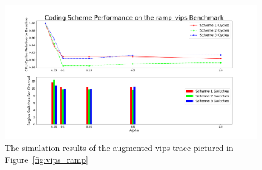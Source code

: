 \begin{figure}[htbp]
		\includegraphics[width=\linewidth]{fig/vips_ramp_results.png}
		\caption{The simulation results of the augmented vips trace pictured in Figure~\ref{fig:vips_ramp}}
		\label{fig:vips_ramp_result}
\end{figure}


